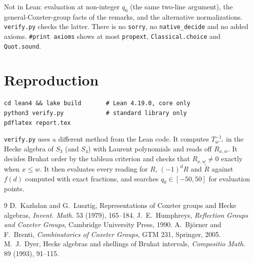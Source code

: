\documentclass[11pt]{article}
\theoremstyle{remark}
\begin{document}
Not in Lean: evaluation at non-integer $q_0$ (the same two-line argument), the
general-Coxeter-group facts of the remarks, and the alternative normalizations.
\texttt{verify.py} checks the latter. There is no \texttt{sorry}, no
\texttt{native\_decide} and no added axioms. \texttt{\#print axioms} shows at most
\texttt{propext}, \texttt{Classical.choice} and \texttt{Quot.sound}.

\section{Reproduction}
\begin{verbatim}
cd lean4 && lake build       # Lean 4.19.0, core only
python3 verify.py            # standard library only
pdflatex report.tex
\end{verbatim}
\texttt{verify.py} uses a different method from the Lean code. It computes
$T_{w^{-1}}^{-1}$ in the Hecke algebra of $S_3$ (and $S_4$) with Laurent
polynomials and reads off $R_{x,w}$. It decides Bruhat order by the tableau
criterion and checks that $R_{x,w}\ne0$ exactly when $x\le w$. It then evaluates
every reading for $R$, $(-1)^dR$ and $\widetilde R$ against $f(d)$ computed with
exact fractions, and searches $q_0\in[-50,50]$ for evaluation points.

\begin{thebibliography}{9}
 D.~Kazhdan and G.~Lusztig, Representations of Coxeter groups and
Hecke algebras, \emph{Invent. Math.} 53 (1979), 165--184.
 J.~E.~Humphreys, \emph{Reflection Groups and Coxeter Groups},
Cambridge University Press, 1990.
 A.~Bj\"orner and F.~Brenti, \emph{Combinatorics of Coxeter Groups},
GTM 231, Springer, 2005.
 M.~J.~Dyer, Hecke algebras and shellings of Bruhat intervals,
\emph{Compositio Math.} 89 (1993), 91--115.
\end{thebibliography}
\end{document}
